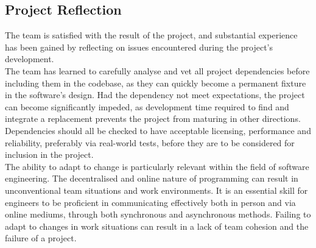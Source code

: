 \documentclass{article}
\begin{document}
\subsection{Project Reflection}
The team is satisfied with the result of the project, and substantial
experience has been gained by reflecting on issues encountered during the
project's development.\\
The team has learned to carefully analyse and vet all project dependencies
before including them in the codebase, as they can quickly become a permanent
fixture in the software's design. Had the dependency not meet expectations,
the project can become significantly impeded, as development time required
to find and integrate a replacement prevents the project from maturing in
other directions. Dependencies should all be checked to have acceptable
licensing, performance and reliability, preferably via real-world tests, before
they are to be considered for inclusion in the project.\\
The ability to adapt to change is particularly relevant within the field of
software engineering. The decentralised and online nature of programming can
result in unconventional team situations and work environments.
It is an essential skill for engineers to be proficient in communicating
effectively both in person and via online mediums, through both synchronous and
asynchronous methods. Failing to adapt to changes in work situations can result
in a lack of team cohesion and the failure of a project.
\end{document}
